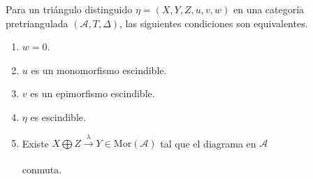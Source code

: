 \documentclass[tesis]{subfiles}
\begin{document}
\begin{Prop}\label{Mendoza_CT-1.8} 
    Para un triángulo distinguido $\eta=(X,Y,Z,u,v,w)$ en una categoría pretriangulada $(\mathscr{A},T,\Delta)$, las siguientes condiciones son equivalentes.

    \begin{enumerate}[label=(\alph*)]
    
        \item $w=0$.

        \item $u$ es un monomorfismo escindible.

        \item $v$ es un epimorfismo escindible.

        \item $\eta$ es escindible. 

        \item Existe $X\bigoplus Z\xrightarrow[]{\lambda}Y\in\text{Mor}(\mathscr{A})$ tal que el diagrama en $\mathscr{A}$
            \begin{center}
           \end{center}
           conmuta.
    \end{enumerate}
\end{Prop}
\end{document}
